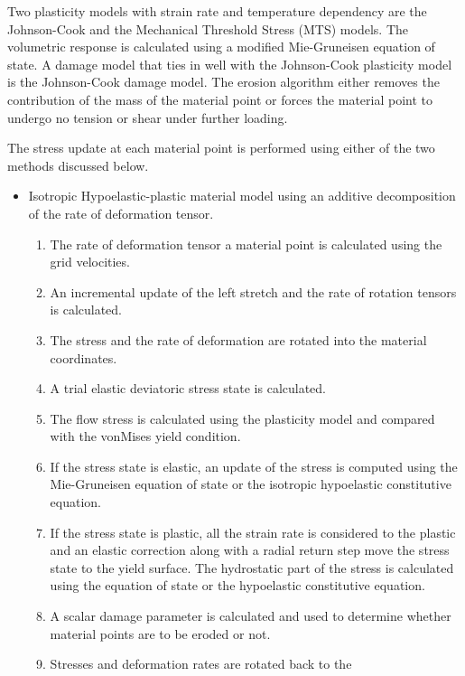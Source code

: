 \documentclass[10pt]{article}
\begin{document}
Two plasticity models with strain rate and temperature dependency 
are the Johnson-Cook and the Mechanical Threshold Stress (MTS) 
models.  The volumetric response is calculated using a modified
Mie-Gruneisen equation of state.  A damage model that ties in well 
with the Johnson-Cook plasticity model is the Johnson-Cook damage 
model.  The erosion algorithm either removes the contribution
of the mass of the material point or forces the material point
to undergo no tension or shear under further loading.

The stress update at each material point is performed using either
of the two methods discussed below.
\begin{itemize}
   \item Isotropic Hypoelastic-plastic material model using an 
         additive decomposition of the rate of deformation tensor.
     \begin{enumerate}
        \item The rate of deformation tensor a material point
              is calculated using the grid velocities.
        \item An incremental update of the left stretch and the
              rate of rotation tensors is calculated.
        \item The stress and the rate of deformation are rotated
              into the material coordinates.
        \item A trial elastic deviatoric stress state is calculated.
        \item The flow stress is calculated using the plasticity
              model and compared with the vonMises yield condition.
        \item If the stress state is elastic, an update of the 
              stress is computed using the Mie-Gruneisen equation
              of state or the isotropic hypoelastic constitutive
              equation.
        \item If the stress state is plastic, all the strain rate 
              is considered to the plastic and an elastic correction
              along with a radial return step move the stress state
              to the yield surface.  The hydrostatic part of the 
              stress is calculated using the equation of state or
              the hypoelastic constitutive equation.
        \item A scalar damage parameter is calculated and used
              to determine whether material points are to be eroded
              or not.
        \item Stresses and deformation rates are rotated back to the

\end{enumerate}
\end{itemize}
\end{document}
